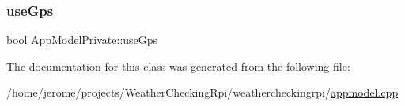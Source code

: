 \subsubsection{\texorpdfstring{use\+Gps}{useGps}}
{\footnotesize\ttfamily bool App\+Model\+Private\+::use\+Gps}



The documentation for this class was generated from the following file\+:\begin{DoxyCompactItemize}
\item 
/home/jerome/projects/\+Weather\+Checking\+Rpi/weathercheckingrpi/\hyperlink{appmodel_8cpp}{appmodel.\+cpp}\end{DoxyCompactItemize}
